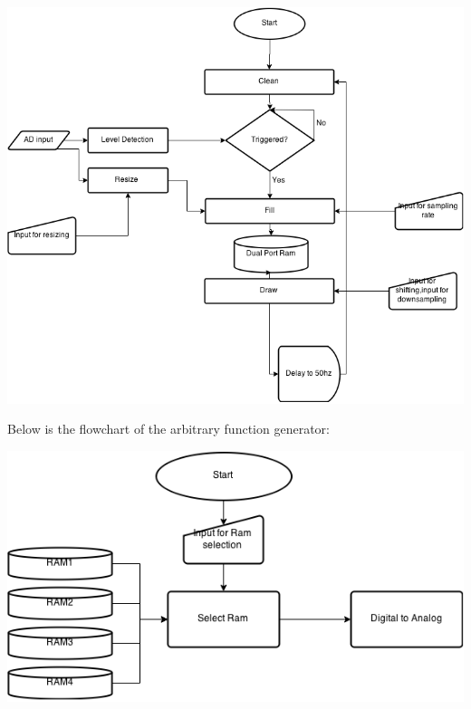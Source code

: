 \documentclass[11pt]{scrartcl}
\begin{document}
\begin{center}
\begin{minipage}[t]{\linewidth}

{
\includegraphics[scale = 0.5]{adchar.png}
}
\end{minipage}
\medskip
\end{center}
Below is the flowchart of the arbitrary function generator:
\begin{center}
\begin{minipage}[t]{\linewidth}

{
\includegraphics[scale = 0.6]{dachart.png}
}
\end{minipage}
\medskip
\end{center}
\end{document}
